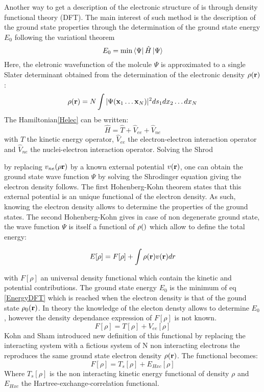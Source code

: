 \documentclass[12pt]{article}
\numberwithin{equation}{section}
\begin{document}
Another way to get a description of the electronic structure of is through density functional theory (DFT).
The main interest of such method is the description of the ground state properties through the determination of the ground state energy $E_0$ following the variationl theorem
\begin{equation}
    E_0 = \min \bra{\Psi} \hat{H} \ket{\Psi}
\end{equation}
Here, the eletronic wavefunction of the molcule $\Psi$ is approximated to a single Slater determinant obtained from the determination of the electronic density $\rho(\vb r)$:
\begin{equation}
    \rho(\vb r)=N\int |\Psi(\vb x_1 \ldots \vb x_N)|^2 ds_1 dx_2 \ldots dx_N
\end{equation}
The Hamiltonian\ref{Helec} can be written:
\begin{equation}\label{Hop}
    \hat{H}=\hat{T} + \hat{V}_{ee} + \hat{V}_{ne}
\end{equation} 
with $\hat{T}$ the kinetic energy operator, $\hat{V}_{ee}$ the electron-electron interaction operator and $\hat{V}_{ne}$ the nuclei-electron interaction operator. 
Solving the Shrod

by replacing $v_{ne}(\rho\vb r)$ by a known external potential $v(\vb r)$, one can obtain the ground state wave function $\Psi$ by solving the Shrodinger equation giving the electron density follows.
The first Hohenberg-Kohn theorem states that this external potential is an unique functional of the electron density.
As such, knowing the electron density allows to determine the properties of the ground states.
The second Hohenberg-Kohn gives in case of non degenerate ground state, the wave function $\Psi$ is itself a functionl of $\rho(\vb)$ which allow to define the total energy:

\begin{equation}\label{EnergyDFT}
    E[\rho]= F[\rho]+ \int \rho(\vb r) v(\vb r)dr
\end{equation}

with $F[\rho]$ an universal density functional which contain the kinetic and potential contributions.
The ground state energy $E_0$ is the minimum of eq \ref{EnergyDFT} which is reached when the electron density is that of the gound state $\rho_0(\vb r)$.
In theory the knowledge of the electon densty allows to determine $E_0$, however the density dependance expression of $F[\rho]$ is not known.
\begin{equation}
    F[\rho]=T[\rho]+V_{ee}[\rho]
\end{equation}
Kohn and Sham introduced new definition of this functional by replacing the interacting system with a fictious system of N non interacting electrons the reproduces the same ground state electron density $\rho(\vb r)$.
The functional becomes:
\begin{equation}
    F[\rho]=T_s[\rho]+E_{Hxc}[\rho]
\end{equation}
Where $T_s[\rho]$ is the non interacting kinetic energy functional of density $\rho$ and $E_{Hxc}$ the Hartree-exchange-correlation functional.
\end{document}
